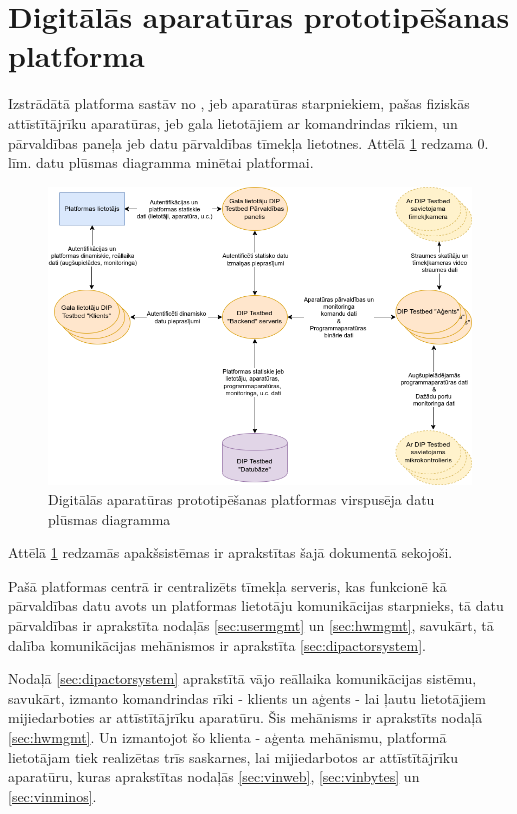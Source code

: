 \section{Digitālās aparatūras prototipēšanas platforma}
\label{sec:dipplatform}

Izstrādātā platforma sastāv no , 
jeb aparatūras starpniekiem, pašas fiziskās attīstītājrīku aparatūras,
 jeb gala lietotājiem ar komandrindas rīkiem, un
pārvaldības paneļa jeb datu pārvaldības tīmekļa lietotnes. Attēlā
\ref{fig:dipdpd0} redzama 0. līm. datu plūsmas diagramma minētai platformai. 

\begin{figure}[H]
    \includegraphics[width=1.0\linewidth]{assets/DPD0.drawio.png}
    \centering
    \caption{Digitālās aparatūras prototipēšanas platformas virspusēja datu plūsmas diagramma}
    \label{fig:dipdpd0}
\end{figure}

Attēlā \ref{fig:dipdpd0} redzamās apakšsistēmas ir aprakstītas šajā dokumentā
sekojoši. 

Pašā platformas centrā ir centralizēts tīmekļa serveris, kas funkcionē
kā pārvaldības datu avots un platformas lietotāju komunikācijas starpnieks, tā
datu pārvaldības ir aprakstīta nodaļās \ref{sec:usermgmt} un \ref{sec:hwmgmt},
savukārt, tā dalība komunikācijas mehānismos ir aprakstīta \ref{sec:dipactorsystem}.

Nodaļā \ref{sec:dipactorsystem} aprakstītā vājo reāllaika komunikācijas sistēmu,
savukārt, izmanto komandrindas rīki - klients un aģents - lai ļautu lietotājiem
mijiedarboties ar attīstītājrīku aparatūru. Šis mehānisms ir aprakstīts nodaļā
\ref{sec:hwmgmt}. Un izmantojot šo klienta - aģenta mehānismu, platformā
lietotājam tiek realizētas trīs saskarnes, lai mijiedarbotos ar attīstītājrīku
aparatūru, kuras aprakstītas nodaļās \ref{sec:vinweb}, \ref{sec:vinbytes} un
\ref{sec:vinminos}.

